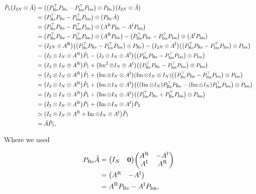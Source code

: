 \documentclass{article}
\newcommand{\AR}{A^{\text{R}}}
\newcommand{\AI}{A^{\text{I}}}
\newcommand{\Pre}{P_{\text{Re}}}
\newcommand{\Pim}{P_{\text{Im}}}
\begin{document}
\begin{align*}
  \hat P_1 \qty(I_{2N} \otimes \tilde A)
  &= \qty(\qty(\Pre^\top\Pre - \Pim^\top\Pim) \otimes \Pre) \qty(I_{2N} \otimes \tilde A) \\
  &= \qty(\Pre^\top\Pre - \Pim^\top\Pim) \otimes \qty(\Pre \tilde A) \\
  &= \qty(\Pre^\top\Pre - \Pim^\top\Pim) \otimes \qty(\AR \Pre - \AI \Pim) \\
  &= \qty(\Pre^\top\Pre - \Pim^\top\Pim) \otimes \qty(\AR \Pre) - \qty(\Pre^\top\Pre - \Pim^\top\Pim) \otimes \qty(\AI \Pim) \\
  &= \qty(I_{2N} \otimes \AR) \qty(\qty(\Pre^\top\Pre - \Pim^\top\Pim) \otimes \Pre) - \qty(I_{2N} \otimes \AI) \qty(\qty(\Pre^\top\Pre - \Pim^\top\Pim) \otimes \Pim) \\ 
  &= \qty(I_2 \otimes I_N \otimes \AR) \hat P_1 - \qty(I_2 \otimes I_N \otimes \AI) \qty(\qty(\Pre^\top\Pre - \Pim^\top\Pim) \otimes \Pim) \\ 
  &= \qty(I_2 \otimes I_N \otimes \AR) \hat P_1 + \qty(\Im^2 \otimes I_N \otimes \AI) \qty(\qty(\Pre^\top\Pre - \Pim^\top\Pim) \otimes \Pim) \\ 
  &= \qty(I_2 \otimes I_N \otimes \AR) \hat P_1 + \qty(\Im \otimes I_N \otimes \AI) \qty(\Im \otimes I_N \otimes I_N) \qty(\qty(\Pre^\top\Pre - \Pim^\top\Pim) \otimes \Pim) \\ 
  &= \qty(I_2 \otimes I_N \otimes \AR) \hat P_1 + \qty(\Im \otimes I_N \otimes \AI) \qty( \qty(\qty(\Im \otimes I_N)\Pre^\top\Pre - \qty(\Im \otimes I_N)\Pim^\top\Pim) \otimes \Pim) \\ 
  &= \qty(I_2 \otimes I_N \otimes \AR) \hat P_1 + \qty(\Im \otimes I_N \otimes \AI) \qty( \qty(\Pim^\top\Pre + \Pre^\top\Pim) \otimes \Pim) \\ 
  &= \qty(I_2 \otimes I_N \otimes \AR) \hat P_1 + \qty(\Im \otimes I_N \otimes \AI) \hat P_2\\ 
  &\simeq \qty(I_2 \otimes I_N \otimes \AR + \Im \otimes I_N \otimes \AI) \hat P_1 \\
  &= \hat A \hat P_1,
\end{align*}

\noindent
Where we used 

\begin{align*}
  \Pre \tilde A &= \mqty(I_N & \vb{0}) \mqty(\AR & -\AI \\ \AI & \AR) \\
  &= \mqty(\AR & -\AI) \\
  &= \AR \Pre - \AI \Pim,
\end{align*}
\end{document}
